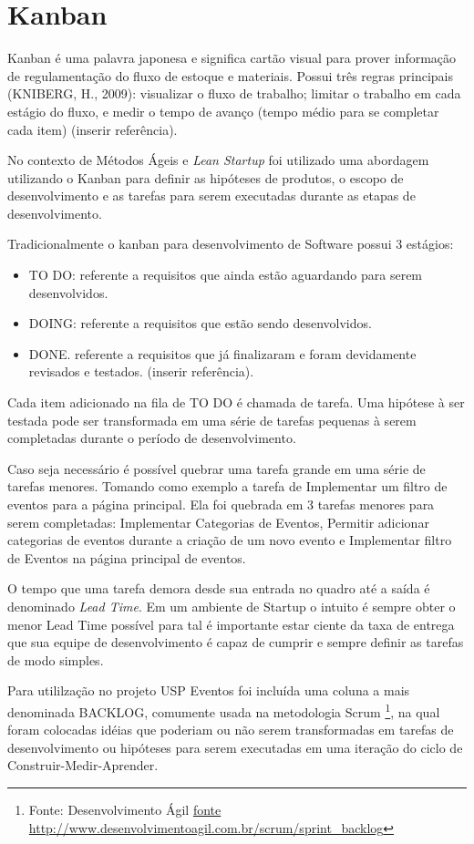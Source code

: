\section{Kanban}
\par Kanban é uma palavra japonesa e significa cartão visual para prover informação de regulamentação do fluxo de estoque e materiais. Possui três regras principais (KNIBERG, H., 2009): visualizar o fluxo de trabalho; limitar o trabalho em cada estágio do fluxo, e medir o tempo de avanço (tempo médio para se completar cada item) (inserir referência).
\par No contexto de Métodos Ágeis e \emph{Lean Startup} foi utilizado uma abordagem utilizando o Kanban para definir as hipóteses de produtos,  o escopo de desenvolvimento e as tarefas para serem executadas durante as etapas de desenvolvimento.
\par Tradicionalmente o kanban para desenvolvimento de Software possui 3 estágios:
\begin{itemize}
        \item TO DO: referente a requisitos que ainda estão aguardando para serem
desenvolvidos.
        \item DOING: referente a requisitos que estão sendo desenvolvidos.
        \item DONE. referente a requisitos que já finalizaram e foram devidamente
revisados e testados. (inserir referência).
\end{itemize}
\par Cada item adicionado na fila de TO DO é chamada de tarefa. Uma hipótese à ser testada pode ser transformada em uma série de tarefas pequenas à serem completadas durante o período de desenvolvimento.
\par Caso seja necessário é possível quebrar uma tarefa grande em uma série de tarefas menores. Tomando como exemplo a tarefa de Implementar um filtro de eventos para a página principal. Ela foi quebrada em 3 tarefas menores para serem completadas: Implementar Categorias de Eventos, Permitir adicionar categorias de eventos durante a criação de um novo evento e Implementar filtro de Eventos na página principal de eventos.
\par O tempo que uma tarefa demora desde sua entrada no quadro até a saída é denominado \emph{Lead Time}. Em um ambiente de Startup o intuito é sempre obter o menor Lead Time possível para tal é importante estar ciente da taxa de entrega que sua equipe de desenvolvimento é capaz de cumprir e sempre definir as tarefas de modo simples. 
\par Para utililzação no projeto USP Eventos foi incluída uma coluna a mais denominada BACKLOG, comumente usada na metodologia Scrum \footnote{Fonte: Desenvolvimento Ágil \url{fonte http://www.desenvolvimentoagil.com.br/scrum/sprint_backlog}},  na qual foram colocadas idéias que poderiam ou não serem transformadas em tarefas de desenvolvimento ou hipóteses para serem executadas em uma iteração do ciclo de Construir-Medir-Aprender.

